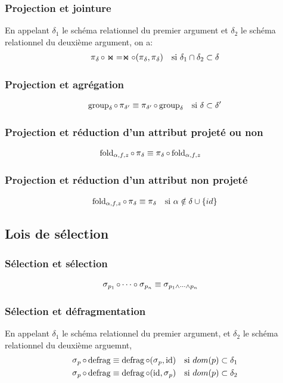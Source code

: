 \subsubsection*{Projection et jointure}
En appelant $\delta_1$ le schéma relationnel du premier
argument et $\delta_2$ le schéma relationnel du deuxième argument,
on a:
\begin{align*}
\projDelta \circ \Join
& = \Join \circ (\projDelta, \projDelta)
& \text{si $\delta_1 \cap \delta_2 \subset \delta$}
\end{align*}
\subsubsection*{Projection et agrégation}
\begin{align*}
\groupDelta \circ \proj_{\delta'}
& \equiv \proj_{\delta'} \circ \groupDelta
& \text{si $\delta \subset \delta'$}
\end{align*}
\subsubsection*{Projection et réduction d'un attribut projeté ou non}
\begin{align*}
\foldAlphafz \circ \projDelta
& \equiv \projDelta \circ \foldAlphafz
\end{align*}
\subsubsection*{Projection et réduction d'un attribut non projeté}
\begin{align*}
\foldAlphafz \circ \projDelta
& \equiv \projDelta
& \text{si $\alpha \notin \dilta$}
\end{align*}
\subsection*{Lois de sélection}
\subsubsection*{Sélection et sélection}
\begin{align*}
\sel_{p_1} \circ \dots \circ \sel_{p_n}
&\equiv \sel_{p_1 \wedge \dots \wedge p_n} 
\end{align*}
\subsubsection*{Sélection et défragmentation}
En appelant $\delta_1$ le schéma relationnel du premier argument,
et $\delta_2$ le schéma relationnel du deuxième arguemnt,
\begin{align*}
\selP \circ \defrag 
& \equiv \defrag \circ (\selP, \id)
& \text{si $dom(p) \subset \delta_1$} \\
\selP \circ \defrag 
& \equiv \defrag \circ (\id, \selP)
& \text{si $dom(p) \subset \delta_2$}
\end{align*}
